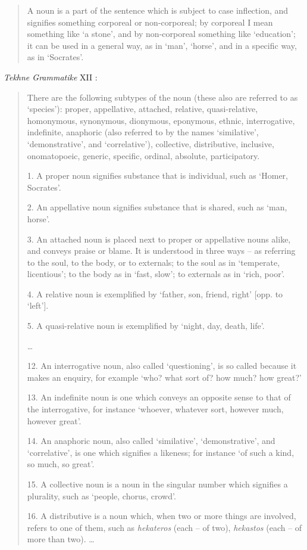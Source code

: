 \documentclass{article}
\begin{document}
\begin{quote}
A noun is a part of the sentence which is subject to case inflection, and
signifies something corporeal or non-corporeal; by corporeal I mean something
like `a stone', and by non-corporeal something like `education'; it can
be used in a general way, as in `man', `horse', and in a specific way, as in
`Socrates'. 
\end{quote}

{\em Tekhne Grammatike} XII \cite[pp.~178--179]{tekhne}:

\begin{quote}
There are the following subtypes of the noun (these also are referred to as `species'): proper, appellative, attached, relative, quasi-relative, homonymous, synonymous, dionymous, eponymous, ethnic, interrogative, indefinite, anaphoric (also referred to by the names `similative', `demonstrative', and `correlative'), collective, distributive, inclusive, onomatopoeic, generic, specific, ordinal, absolute, participatory.

1. A proper noun signifies substance that is individual, such as `Homer, Socrates'.

2. An appellative noun signifies substance that is shared, such as `man, horse'.

3. An attached noun is placed next to proper or appellative nouns alike, and conveys praise or blame. It is understood in three ways -- as referring to the soul, to the body, or to externals; to the soul as in `temperate, licentious'; to the body as in `fast, slow'; to externals as in `rich, poor'.

4. A relative noun is exemplified by `father, son, friend, right' [opp. to `left'].

5. A quasi-relative noun is exemplified by `night, day, death, life'.

\dots

12. An interrogative noun, also called `questioning', is so called because it makes an enquiry, for example `who? what sort of? how much? how great?'

13. An indefinite noun is one which conveys an opposite sense to that of the interrogative, for instance `whoever, whatever sort, however much, however great'.

14. An anaphoric noun, also called `similative', `demonstrative', and `correlative', is one which signifies a likeness; for instance `of such a kind, so much, so great'.

15. A collective noun is a noun in the singular number which signifies a plurality, such as `people, chorus, crowd'.

16. A distributive is a noun which, when two or more things are involved, refers to one of them, such as {\em hekateros} (each -- of two), {\em hekastos} (each -- of more than two).
\dots
\end{quote}
\end{document}
